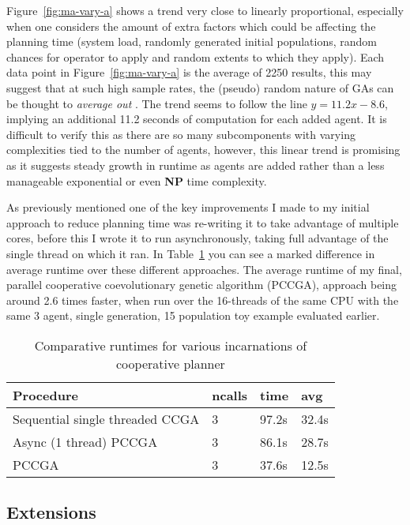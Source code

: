 Figure~\ref{fig:ma-vary-a} shows a trend very close to linearly proportional, especially when one considers the amount of extra factors which could be affecting the planning time (system load, randomly generated initial populations, random chances for operator to apply and random extents to which they apply). Each data point in Figure~\ref{fig:ma-vary-a} is the average of 2250 results, this may suggest that at such high sample rates, the (pseudo) random nature of GAs can be thought to \textit{average out} . The trend seems to follow the line $y = 11.2x - 8.6$, implying an additional 11.2 seconds of computation for each added agent. It is difficult to verify this as there are so many subcomponents with varying complexities tied to the number of agents, however, this linear trend is promising as it suggests steady growth in runtime as agents are added rather than a less manageable exponential or even \textbf{NP} time complexity.

As previously mentioned one of the key improvements I made to my initial approach to reduce planning time was re-writing it to take advantage of multiple cores, before this I wrote it to run asynchronously, taking full advantage of the single thread on which it ran. In Table~\ref{tab:PCGA-speedup} you can see a marked difference in average runtime over these different approaches. The average runtime of my final, parallel cooperative coevolutionary genetic algorithm (PCCGA), approach being around 2.6 times faster, when run over the 16-threads of the same CPU with the same 3 agent, single generation, 15 population toy example evaluated earlier.

\begin{table}
  \centering
  \begin{tabular}{|l l l l|}
    \hline
      Procedure &ncalls     &time   &avg\\
      \hline
      Sequential single threaded CCGA       & 3    &97.2s  &32.4s\\
      Async (1 thread) PCCGA                & 3    &86.1s  &28.7s\\
       PCCGA           &3    &37.6s   &12.5s\\
      \hline
    \end{tabular}
    \caption{\label{tab:PCGA-speedup} Comparative runtimes for various incarnations of cooperative planner}
    \end{table}

\subsection{Extensions}

